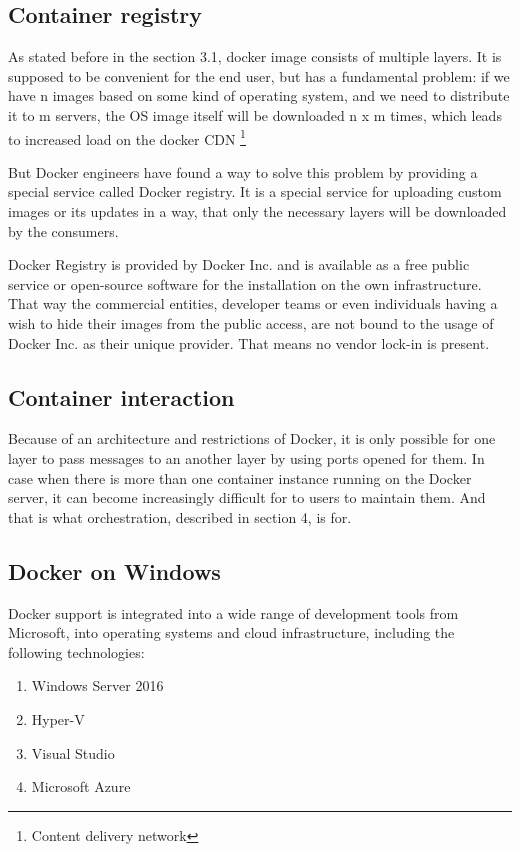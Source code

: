 \subsection{Container registry}

As stated before in the section 3.1, docker image consists of multiple layers.
It is supposed to be convenient for the end user,
but has a fundamental problem: if we have
n images based on some kind of operating system, and we need
to distribute it to m servers, the OS image itself will be downloaded
n x m times, which leads to increased
load on the docker CDN \footnote{Content delivery network}

But Docker engineers have found a way to solve this problem by providing
a special service called Docker registry. It is a special service for uploading
custom images or its updates in a way, that only the necessary layers will be
downloaded by the consumers\cite{AdrMouRegistries:2016}.

Docker Registry is provided by Docker Inc. and is available
as a free public service or open-source software
for the installation on the own infrastructure.
That way the commercial entities, developer teams or even individuals having a
wish to hide their images from the public access,
are not bound to the usage of Docker Inc. as their unique provider. That means
no vendor lock-in is present\cite{AdrMouRegistries:2016}.

\subsection{Container interaction}

Because of an architecture and restrictions of Docker, it is only possible for
one layer to pass messages to an another layer by using ports opened for them.
In case when there is more than one container
instance running on the Docker server, it can become increasingly difficult for
to users to maintain them. And that is what
orchestration, described in section 4, is for.

\subsection{Docker on Windows}

Docker support is integrated into a wide range of development tools
from Microsoft, into operating systems and cloud infrastructure, including
the following technologies:
\begin{enumerate}
\item Windows Server 2016
\item Hyper-V
\item Visual Studio
\item Microsoft Azure
\end{enumerate}

